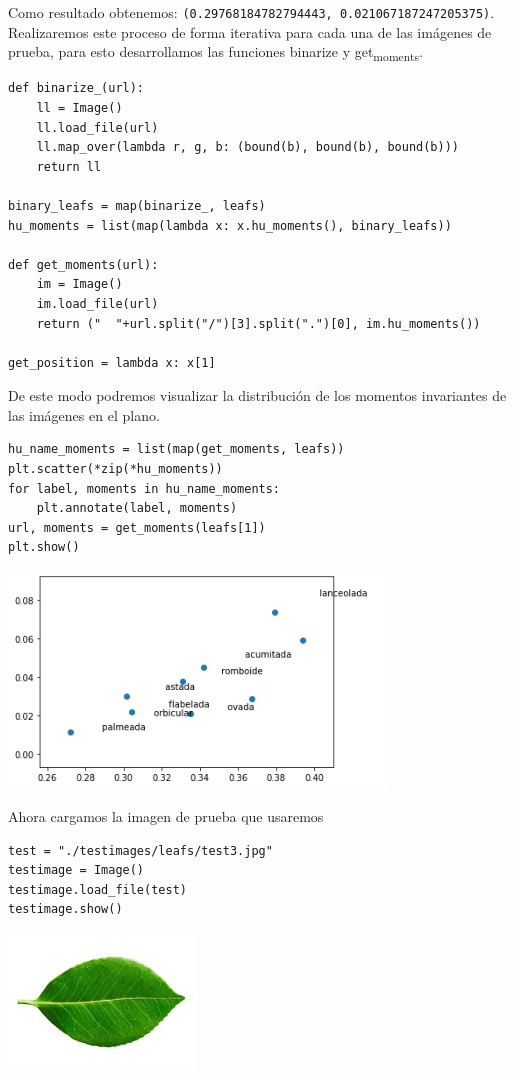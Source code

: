 \documentclass[letter]{article}
\begin{document}
Como resultado obtenemos: \texttt{(0.29768184782794443, 0.021067187247205375)}.
Realizaremos este proceso de forma iterativa para cada una de las imágenes de
prueba, para esto desarrollamos las funciones  binarize y get\textsubscript{moments}.

\begin{verbatim}
def binarize_(url):
    ll = Image()
    ll.load_file(url)
    ll.map_over(lambda r, g, b: (bound(b), bound(b), bound(b)))
    return ll

binary_leafs = map(binarize_, leafs)
hu_moments = list(map(lambda x: x.hu_moments(), binary_leafs))

def get_moments(url):
    im = Image()
    im.load_file(url)
    return ("  "+url.split("/")[3].split(".")[0], im.hu_moments())

get_position = lambda x: x[1]
\end{verbatim}

De este modo podremos visualizar la distribución de los momentos invariantes de
las imágenes en el plano.

\begin{verbatim}
hu_name_moments = list(map(get_moments, leafs))
plt.scatter(*zip(*hu_moments))
for label, moments in hu_name_moments:
    plt.annotate(label, moments)
url, moments = get_moments(leafs[1])
plt.show()
\end{verbatim}

\begin{center}
\includegraphics[width=10cm]{./images/plano.png}
\end{center}

Ahora cargamos la imagen de prueba que usaremos

\begin{verbatim}
test = "./testimages/leafs/test3.jpg"
testimage = Image()
testimage.load_file(test)
testimage.show()
\end{verbatim}

\begin{center}
\includegraphics[width=5cm]{./images/test.png}
\end{center}
\end{document}
